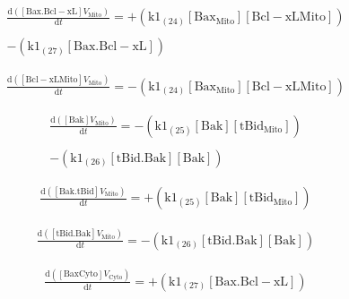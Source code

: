 \documentclass[a4paper,12pt]{article} %
\newcommand{\M}[1]{\mathrm{#1}}
\begin{document}
\begin{equation}
\begin{split}
\frac {\M{d}( {{\M{[Bax.Bcl-xL]}}    {V}_{\M{Mito}} } ) }  {\M{d}{t} }  =  {  +  ( {{\M{k1}}_{\M{(24)}}    {\M{[Bax_{Mito}]}}    {\M{[Bcl-xL{Mito}]}} } ) } \\ 
  \\ 
   {  -  ( {{\M{k1}}_{\M{(27)}}    {\M{[Bax.Bcl-xL]}} } ) }
\end{split}
\end{equation}

\begin{equation}
\begin{split}
\frac {\M{d}( {{\M{[Bcl-xL{Mito}]}}    {V}_{\M{Mito}} } ) }  {\M{d}{t} }  =  {  -  ( {{\M{k1}}_{\M{(24)}}    {\M{[Bax_{Mito}]}}    {\M{[Bcl-xL{Mito}]}} } ) }
\end{split}
\end{equation}

\begin{equation}
\begin{split}
\frac {\M{d}( {{\M{[Bak]}}    {V}_{\M{Mito}} } ) }  {\M{d}{t} }  =  {  -  ( {{\M{k1}}_{\M{(25)}}    {\M{[Bak]}}    {\M{[tBid_{Mito}]}} } ) } \\ 
  \\ 
   {  -  ( {{\M{k1}}_{\M{(26)}}    {\M{[tBid.Bak]}}    {\M{[Bak]}} } ) }
\end{split}
\end{equation}

\begin{equation}
\begin{split}
\frac {\M{d}( {{\M{[Bak.tBid]}}    {V}_{\M{Mito}} } ) }  {\M{d}{t} }  =  {  +  ( {{\M{k1}}_{\M{(25)}}    {\M{[Bak]}}    {\M{[tBid_{Mito}]}} } ) }
\end{split}
\end{equation}

\begin{equation}
\begin{split}
\frac {\M{d}( {{\M{[tBid.Bak]}}    {V}_{\M{Mito}} } ) }  {\M{d}{t} }  =  {  -  ( {{\M{k1}}_{\M{(26)}}    {\M{[tBid.Bak]}}    {\M{[Bak]}} } ) } 
\end{split}
\end{equation}

\begin{equation}
\begin{split}
\frac {\M{d}( {{\M{[Bax{Cyto}]}}    {V}_{\M{Cyto}} } ) }  {\M{d}{t} }  =  {  +  ( {{\M{k1}}_{\M{(27)}}    {\M{[Bax.Bcl-xL]}} } ) }
\end{split}
\end{equation}
\end{document}
